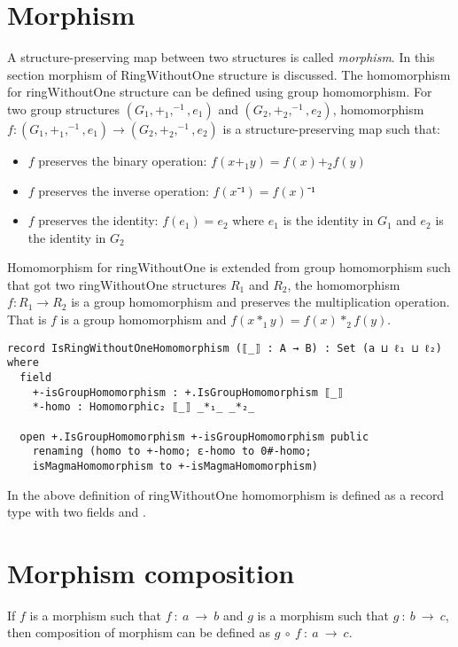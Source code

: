 \section{Morphism} 
A structure-preserving map between two structures is called \textit{morphism}.
In this section morphism of RingWithoutOne structure is discussed. The
homomorphism for ringWithoutOne structure can be defined using group
homomorphism. For two group structures $(G_1,+_1,^{-1},e_1)$ and
$(G_2,+_2,^{-1},e_2)$, homomorphism $f:(G_1,+_1,^{-1},e_1) \rightarrow
(G_2,+_2,^{-1},e_2)$ is a structure-preserving map such that:
\begin{itemize}
  \item $f$ preserves the binary operation: $f(x +_1 y) = f(x) +_2 f(y)$
  \item $f$ preserves the inverse operation: $f(x⁻¹) = f(x)⁻¹$
  \item $f$ preserves the identity: $f(e_1) = e_2$ where $e_1$ is the identity
  in $G_1$ and $e_2$ is the identity in $G_2$
\end{itemize}
Homomorphism for ringWithoutOne is extended from group homomorphism such that
got two ringWithoutOne structures $R_1$ and $R_2$, the homomorphism $f: R_1
\rightarrow R_2$ is a group homomorphism and preserves the multiplication
operation. That is $f$ is a group homomorphism and \(f(x *_1 y) = f(x) *_2
f(y)\).

\begin{verbatim}
record IsRingWithoutOneHomomorphism (⟦_⟧ : A → B) : Set (a ⊔ ℓ₁ ⊔ ℓ₂) where
  field
    +-isGroupHomomorphism : +.IsGroupHomomorphism ⟦_⟧
    *-homo : Homomorphic₂ ⟦_⟧ _*₁_ _*₂_

  open +.IsGroupHomomorphism +-isGroupHomomorphism public
    renaming (homo to +-homo; ε-homo to 0#-homo;
    isMagmaHomomorphism to +-isMagmaHomomorphism)
\end{verbatim} 

In the above definition of ringWithoutOne homomorphism
 is defined as a record type with two
fields  and .

\section{Morphism composition}
If $f$ is a morphism such that $f\ :\ a \ \rightarrow \ b$ and $g$ is a morphism
such that $g\ :\ b\ \rightarrow \ c$, then composition of morphism can be
defined as $g \ ∘\ f\ :\ a \ \rightarrow \ c$.

